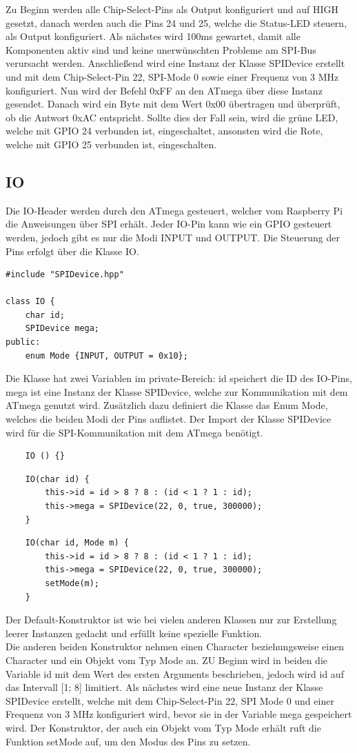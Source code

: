 \documentclass[12pt]{article}
\begin{document}
Zu Beginn werden alle Chip-Select-Pins als Output konfiguriert und auf HIGH gesetzt, danach werden auch die Pins 24 und 25, welche die Status-LED steuern, als Output konfiguriert. Als nächstes wird 100ms gewartet, damit alle Komponenten aktiv sind und keine unerwünschten Probleme am SPI-Bus verursacht werden. Anschließend wird eine Instanz der Klasse SPIDevice erstellt und mit dem Chip-Select-Pin 22, SPI-Mode 0 sowie einer Frequenz von 3 MHz konfiguriert. Nun wird der Befehl 0xFF an den ATmega über diese Instanz gesendet. Danach wird ein Byte mit dem Wert 0x00 übertragen und überprüft, ob die Antwort 0xAC entspricht. Sollte dies der Fall sein, wird die grüne LED, welche mit GPIO 24 verbunden ist, eingeschaltet, ansonsten wird die Rote, welche mit GPIO 25 verbunden ist, eingeschalten.
\subsection{IO}
Die IO-Header werden durch den ATmega gesteuert, welcher vom Raspberry Pi die Anweisungen über SPI erhält. Jeder IO-Pin kann wie ein GPIO gesteuert werden, jedoch gibt es nur die Modi INPUT und OUTPUT. Die Steuerung der Pins erfolgt über die Klasse IO.
\begin{verbatim}
#include "SPIDevice.hpp"

class IO {
    char id;
    SPIDevice mega;
public:
    enum Mode {INPUT, OUTPUT = 0x10};
\end{verbatim}
Die Klasse hat zwei Variablen im private-Bereich: id speichert die ID des IO-Pins, mega ist eine Instanz der Klasse SPIDevice, welche zur Kommunikation mit dem ATmega genutzt wird. Zusätzlich dazu definiert die Klasse das Enum Mode, welches die beiden Modi der Pins auflistet. Der Import der Klasse SPIDevice wird für die SPI-Kommunikation mit dem ATmega benötigt.\\
\begin{verbatim}
    IO () {}
\end{verbatim}
\begin{verbatim}
    IO(char id) {
        this->id = id > 8 ? 8 : (id < 1 ? 1 : id);
        this->mega = SPIDevice(22, 0, true, 300000);
    }
\end{verbatim}
\begin{verbatim}
    IO(char id, Mode m) {
        this->id = id > 8 ? 8 : (id < 1 ? 1 : id);
        this->mega = SPIDevice(22, 0, true, 300000);
        setMode(m);
    }
\end{verbatim}
Der Default-Konstruktor ist wie bei vielen anderen Klassen nur zur Erstellung leerer Instanzen gedacht und erfüllt keine spezielle Funktion. \\Die anderen beiden Konstruktor nehmen einen Character beziehungsweise einen Character und ein Objekt vom Typ Mode an. ZU Beginn wird in beiden die Variable id mit dem Wert des ersten Arguments beschrieben, jedoch wird id auf das Intervall [1; 8] limitiert. Als nächstes wird eine neue Instanz der Klasse SPIDevice erstellt, welche mit dem Chip-Select-Pin 22, SPI Mode 0 und einer Frequenz von 3 MHz konfiguriert wird, bevor sie in der Variable mega gespeichert wird. Der Konstruktor, der auch ein Objekt vom Typ Mode erhält ruft die Funktion setMode auf, um den Modus des Pins zu setzen.\\
\end{document}

